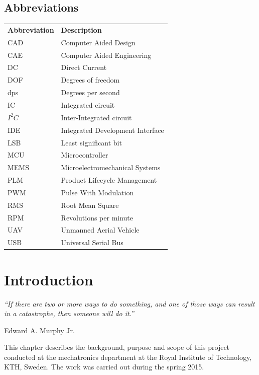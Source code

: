 \documentclass[a4paper,11pt]{kth-mag}
\begin{document}
\section*{Abbreviations}
\noindent{}\begin{tabular}{@{}p{2.5cm}l}
\textbf{Abbreviation} 	& \textbf{Description} \vspace{.5em} \\
CAD			& Computer Aided Design \\
CAE			& Computer Aided Engineering\\
DC			& Direct Current \\
DOF			& Degrees of freedom\\
dps			& Degrees per second\\
IC			& Integrated circuit\\
$I^2C$		& Inter-Integrated circuit\\
IDE 			& Integrated Development Interface \\
LSB			& Least significant bit \\
MCU			& Microcontroller\\
MEMS			& Microelectromechanical Systems \\
PLM			& Product Lifecycle Management\\
PWM			& Pulse With Modulation\\
RMS			& Root Mean Square\\
RPM			& Revolutions per minute\\
UAV			& Unmanned Aerial Vehicle\\
USB			& Universal Serial Bus
\end{tabular}
\cleardoublepage

\mainmatter
\pagestyle{newchap}


\chapter{Introduction}

\epigraph{\textit{“If there are two or more ways to do something, and one of those ways can result in a catastrophe, then someone will do it.”}}{Edward A. Murphy Jr.}

This chapter describes the background, purpose and scope of this project conducted at the mechatronics department at the Royal Institute of Technology, KTH, Sweden. The work was carried out during the spring 2015.
\end{document}
